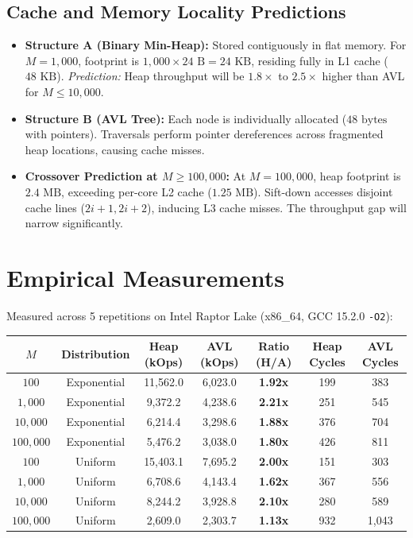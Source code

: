 \documentclass[11pt,a4paper]{article}
\begin{document}
\subsection{Cache and Memory Locality Predictions}
\begin{itemize}
    \item \textbf{Structure A (Binary Min-Heap):}
    Stored contiguously in flat memory. For $M = 1{,}000$, footprint is $1{,}000 \times 24\text{ B} = 24\text{ KB}$, residing fully in L1 cache ($48\text{ KB}$).
    \textit{Prediction:} Heap throughput will be $1.8\times$ to $2.5\times$ higher than AVL for $M \le 10{,}000$.
    \item \textbf{Structure B (AVL Tree):}
    Each node is individually allocated ($48\text{ bytes}$ with pointers). Traversals perform pointer dereferences across fragmented heap locations, causing cache misses.
    \item \textbf{Crossover Prediction at $M \ge 100{,}000$:}
    At $M = 100{,}000$, heap footprint is $2.4\text{ MB}$, exceeding per-core L2 cache ($1.25\text{ MB}$). Sift-down accesses disjoint cache lines ($2i+1, 2i+2$), inducing L3 cache misses. The throughput gap will narrow significantly.
\end{itemize}

\section{Empirical Measurements}
Measured across 5 repetitions on Intel Raptor Lake (x86\_64, GCC 15.2.0 \texttt{-O2}):
\begin{center}
\begin{tabular}{|c|c|c|c|c|c|c|}
\hline
\textbf{$M$} & \textbf{Distribution} & \textbf{Heap (kOps)} & \textbf{AVL (kOps)} & \textbf{Ratio (H/A)} & \textbf{Heap Cycles} & \textbf{AVL Cycles} \\
\hline
$100$ & Exponential & 11,562.0 & 6,023.0 & \textbf{1.92x} & 199 & 383 \\
$1{,}000$ & Exponential & 9,372.2 & 4,238.6 & \textbf{2.21x} & 251 & 545 \\
$10{,}000$ & Exponential & 6,214.4 & 3,298.6 & \textbf{1.88x} & 376 & 704 \\
$100{,}000$ & Exponential & 5,476.2 & 3,038.0 & \textbf{1.80x} & 426 & 811 \\
\hline
$100$ & Uniform & 15,403.1 & 7,695.2 & \textbf{2.00x} & 151 & 303 \\
$1{,}000$ & Uniform & 6,708.6 & 4,143.4 & \textbf{1.62x} & 367 & 556 \\
$10{,}000$ & Uniform & 8,244.2 & 3,928.8 & \textbf{2.10x} & 280 & 589 \\
$100{,}000$ & Uniform & 2,609.0 & 2,303.7 & \textbf{1.13x} & 932 & 1,043 \\
\hline
\end{tabular}
\end{center}
\end{document}
